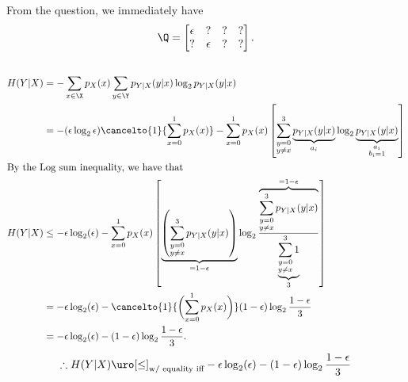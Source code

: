 \documentclass[
  coursecode={MTHE 474},
  assignmentname={Homework \homeworknumber},
  studentnumber=20053722,
  name={Bryan Hoang},
  draft,
]{
  ltxanswer%
}
\begin{document}
  \begin{questions}
    \setcounter{question}{\questionnumber}
    \addtocounter{question}{-1}
    \question[10]
    From the question, we immediately have
    \begin{equation*}
      \Q = \begin{bmatrix}
        \epsilon & ?        & ? & ? \\
        ?        & \epsilon & ? & ?
      \end{bmatrix}.
    \end{equation*}
    \begin{parts}
      \part{}
      \begin{solution}
        \begin{align*}
          H(Y|X) &= -\sum_{x \in \X} p_{X}(x) \sum_{y \in \Y} p_{Y|X}(y|x) \log_{2} p_{Y|X}(y|x)                                                 \\
                 &= -(\epsilon \log_{2} \epsilon) \cancelto{1}{\sum_{x = 0}^{1} p_{X}(x)} - \sum_{x=0}^{1} p_{X}(x) \left[\sum_{\substack{y = 0  \\y \neq x}}^{3} \underbrace{p_{Y|X}(y|x)}_{a_{i}} \log_{2} \underbrace{p_{Y|X}(y|x)}_{\substack{a_{i}\\b_{i}=1}}\right] \\
          \intertext{By the Log sum inequality, we have that}
          H(Y|X) &\le -\epsilon\log_{2}(\epsilon)-\sum_{x=0}^{1} p_{X}(x)\left[\underbrace{\left(\sum_{\substack{y=0                             \\y\neq x}}^{3}p_{Y|X}(y|x)\right)}_{=1-\epsilon}\log_{2}\frac{\overbrace{\sum_{\substack{y=0\\y\neq x}}^{3}p_{Y|X}(y|x)}^{=1-\epsilon}}{\underbrace{\sum_{\substack{y=0\\y\neq x}}^{3} 1}_{3}}\right] \\
                 &= -\epsilon\log_{2}(\epsilon) - \cancelto{1}{\biggl(\sum_{x=0}^{1} p_{X}(x)\biggr)} (1-\epsilon) \log_{2} \frac{1-\epsilon}{3} \\
                 &= -\epsilon\log_{2}(\epsilon) - (1-\epsilon) \log_{2} \frac{1-\epsilon}{3}.
        \end{align*}
        \begin{align*}
          \therefore H(Y|X)                     &\uro[\le]_{\text{w/ equality iff}} - \epsilon\log_{2}(\epsilon) - (1-\epsilon) \log_{2} \frac{1-\epsilon}{3}                     \\

\end{align*}
\end{solution}
\end{parts}
\end{questions}
\end{document}
